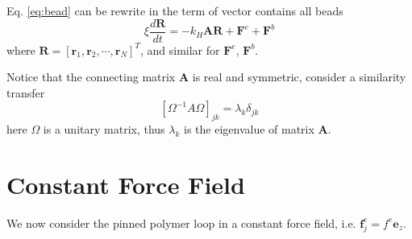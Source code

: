 \documentclass[12pt,a4paper]{article}
\begin{document}
Eq. \eqref{eq:bead} can be rewrite in the term of vector contains all beads
\begin{equation}
    \label{eq:beadVector}
    \xi \frac{d \mathbf{R}}{dt} = - k_H \mathbf{A} \mathbf{R} + \mathbf{F}^e + \mathbf{F}^b
\end{equation}
where $\mathbf{R} = \left[\mathbf r_1, \mathbf r_2, \cdots, \mathbf r_N\right]^T$,
and similar for $\mathbf{F}^e$, $\mathbf{F}^b$.

Notice that the connecting matrix $\mathbf{A}$ is real and symmetric, consider
a similarity transfer 
\begin{equation}
    \label{eq:similarityTransfer}
    \left[\Omega^{-1} A \Omega\right]_{jk} = \lambda_k\delta_{jk}
\end{equation}
here $\Omega$ is a unitary matrix, thus $\lambda_k$ is the eigenvalue of
matrix $\mathbf A$. 





\section{Constant Force Field}
\label{sec:constantForceField}
We now consider the pinned polymer loop in a constant force field, i.e.
$\mathbf{f}_j^e = f^e \mathbf{e}_z$.




 
\end{document}
